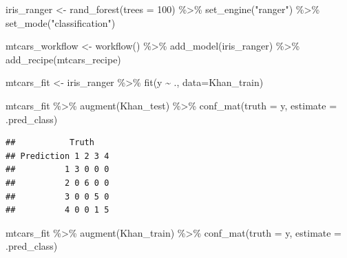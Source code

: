 \documentclass[
]{book}
\newenvironment{Shaded}{\begin{snugshade}}{\end{snugshade}}
\newcommand{\AttributeTok}[1]{\textcolor[rgb]{0.77,0.63,0.00}{#1}}
\newcommand{\DecValTok}[1]{\textcolor[rgb]{0.00,0.00,0.81}{#1}}
\newcommand{\FunctionTok}[1]{\textcolor[rgb]{0.00,0.00,0.00}{#1}}
\newcommand{\NormalTok}[1]{#1}
\newcommand{\OtherTok}[1]{\textcolor[rgb]{0.56,0.35,0.01}{#1}}
\newcommand{\SpecialCharTok}[1]{\textcolor[rgb]{0.00,0.00,0.00}{#1}}
\newcommand{\StringTok}[1]{\textcolor[rgb]{0.31,0.60,0.02}{#1}}
\begin{document}
\begin{Shaded}
\begin{Highlighting}[]
\NormalTok{iris\_ranger }\OtherTok{\textless{}{-}} \FunctionTok{rand\_forest}\NormalTok{(}\AttributeTok{trees =} \DecValTok{100}\NormalTok{) }\SpecialCharTok{\%\textgreater{}\%}
  \FunctionTok{set\_engine}\NormalTok{(}\StringTok{"ranger"}\NormalTok{) }\SpecialCharTok{\%\textgreater{}\%}
  \FunctionTok{set\_mode}\NormalTok{(}\StringTok{"classification"}\NormalTok{)}
\end{Highlighting}
\end{Shaded}

\begin{Shaded}
\begin{Highlighting}[]
\NormalTok{mtcars\_workflow }\OtherTok{\textless{}{-}} \FunctionTok{workflow}\NormalTok{() }\SpecialCharTok{\%\textgreater{}\%} 
                  \FunctionTok{add\_model}\NormalTok{(iris\_ranger) }\SpecialCharTok{\%\textgreater{}\%} 
                  \FunctionTok{add\_recipe}\NormalTok{(mtcars\_recipe)}
\end{Highlighting}
\end{Shaded}

\begin{Shaded}
\begin{Highlighting}[]
\NormalTok{mtcars\_fit }\OtherTok{\textless{}{-}}\NormalTok{ iris\_ranger }\SpecialCharTok{\%\textgreater{}\%} \FunctionTok{fit}\NormalTok{(y }\SpecialCharTok{\textasciitilde{}}\NormalTok{ ., }\AttributeTok{data=}\NormalTok{Khan\_train)}

\NormalTok{mtcars\_fit }\SpecialCharTok{\%\textgreater{}\%} \FunctionTok{augment}\NormalTok{(Khan\_test) }\SpecialCharTok{\%\textgreater{}\%} \FunctionTok{conf\_mat}\NormalTok{(}\AttributeTok{truth =}\NormalTok{ y, }\AttributeTok{estimate =}\NormalTok{ .pred\_class)}
\end{Highlighting}
\end{Shaded}

\begin{verbatim}
##           Truth
## Prediction 1 2 3 4
##          1 3 0 0 0
##          2 0 6 0 0
##          3 0 0 5 0
##          4 0 0 1 5
\end{verbatim}

\begin{Shaded}
\begin{Highlighting}[]
\NormalTok{mtcars\_fit }\SpecialCharTok{\%\textgreater{}\%} \FunctionTok{augment}\NormalTok{(Khan\_train) }\SpecialCharTok{\%\textgreater{}\%} \FunctionTok{conf\_mat}\NormalTok{(}\AttributeTok{truth =}\NormalTok{ y, }\AttributeTok{estimate =}\NormalTok{ .pred\_class)}
\end{Highlighting}
\end{Shaded}
\end{document}
